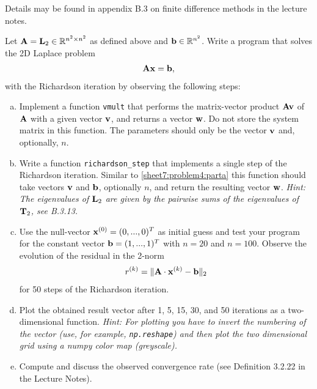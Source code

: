 \begin{Sheet}
\begin{Problem}[Programming]
    Details may be found in appendix B.3 on finite difference methods in the lecture notes. 
    
    Let $\mathbf A=\mathbf L_2\in\mathbb R^{n^2\times n^2}$ as defined above and $\mathbf b\in \mathbb R^{n^2}$.
    Write a program that solves the 2D Laplace problem
    \begin{gather*}
      \mathbf A\mathbf x=\mathbf b,
    \end{gather*}
    with the Richardson iteration by observing the following
    steps:
    \begin{enumerate}[(a)]
    \item\label{sheet7:problem4:parta} Implement a function
      \lstinline{vmult} that performs the matrix-vector product
      $\mathbf A\mathbf v$ of $\mathbf A$ with a given vector $\mathbf v$, and
      returns a vector $\mathbf w$. 
      Do not store the system matrix in this function.
      The parameters should only be the vector $\mathbf v$ and, optionally, $n$.
    \item Write a function \lstinline{richardson_step} that
      implements a single step of the Richardson iteration. Similar to 
      \eqref{sheet7:problem4:parta} this function should take vectors
      $\mathbf v$ and $\mathbf b$, optionally $n$, and return the resulting vector $\mathbf w$.
      \textit{Hint: The eigenvalues of $\mathbf L_2$ are given by the pairwise sums of the eigenvalues of $\mathbf T_2$, see B.3.13.}
    \item Use the null-vector $\mathbf x^{(0)} = (0,...,0)^T$ as initial
      guess and test your program for the constant vector $\mathbf b=(1,...,1)^T$ with $n=20$ and $n=100$.
      Observe the evolution of the residual in the 2-norm
      \begin{gather*}
        r^{(k)} = \lVert\mathbf A\cdot\mathbf x^{(k)}-\mathbf b\rVert_2
      \end{gather*}
      for 50 steps of the Richardson iteration.  
   \item Plot the obtained
      result vector after 1, 5, 15, 30, and 50 iterations as a two-dimensional function.
      \textit{Hint: For plotting you have to invert the numbering of the vector (use, for example, \lstinline{np.reshape}) and then plot the two dimensional grid using a numpy color map (greyscale).}      
  \item Compute and discuss the observed convergence rate (see Definition 3.2.22 in the Lecture Notes).
   \end{enumerate}
  \end{Problem}

\end{Sheet}


